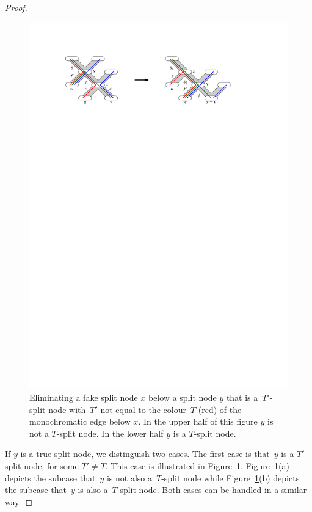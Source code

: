 \begin{proof}
\begin{figure}
    \includegraphics{../figs/ch4/double-split-transformation}
    \caption{Eliminating a fake split node $x$ below a split node $y$ {that is a~$T'$-split node with~$T'$ not equal to} the colour~$T$ {(red)} of the monochromatic edge below $x$.
      In the upper half of this figure $y$ is not a $T$-split node.
      In the lower half $y$ is a $T$-split node.}
    \label{fig:foreign-split-transformation}
  \end{figure}

  If $y$ is a true split node, we distinguish two cases.   The first case is that~$y$ is a $T'$-split node, for some $T' \ne T$. This case is illustrated in Figure~\ref{fig:foreign-split-transformation}. Figure~\ref{fig:foreign-split-transformation}(a) depicts the subcase that~$y$ is not {also} a~$T$-split node while Figure~\ref{fig:foreign-split-transformation}(b) depicts the subcase that~$y$ is also a~$T$-split node. Both cases can be handled in a similar way.



\end{proof}
